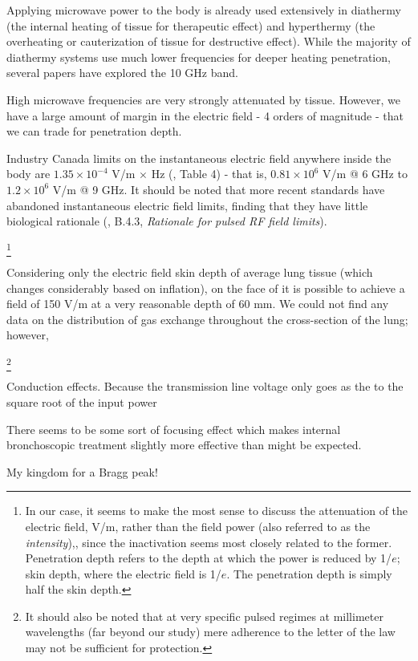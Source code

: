 \documentclass[paper.tex]{subfiles}
\begin{document}
Applying microwave power to the body is already used extensively in diathermy (the internal heating of tissue for therapeutic effect) and hyperthermy (the overheating or cauterization of tissue for destructive effect). While the majority of diathermy systems use much lower frequencies for deeper heating penetration, several papers have explored the 10 GHz band. 

High microwave frequencies are very strongly attenuated by tissue. However, we have a large amount of margin in the electric field - 4 orders of magnitude - that we can trade for penetration depth.

\cite{neuroinvasive2020} \cite{situ2020}


Industry Canada limits on the instantaneous electric field anywhere inside the body are $1.35 \times 10^{-4}$ V/m $\times$ Hz (\cite{RSS1022015}, Table 4) - that is, $0.81 \times 10^6$ V/m @ 6 GHz to $1.2 \times 10^6$ V/m @ 9 GHz. It should be noted that more recent standards have abandoned instantaneous electric field limits, finding that they have little biological rationale (\cite{C95}, B.4.3, {\it Rationale for pulsed RF field limits}).

\footnote{In our case, it seems to make the most sense to discuss the attenuation of the electric field, V/m, rather than the field power (also referred to as the {\it intensity}),\Wsqm, since the inactivation seems most closely related to the former. Penetration depth refers to the depth at which the power is reduced by 1/$e$; skin depth, where the electric field is 1/$e$. The penetration depth is simply half the skin depth.\cite{Penetration2019a}}

Considering only the electric field skin depth\cite{Safety2001}\cite{Physical1982} of average lung tissue\cite{gabriel1996compilation}\cite{Dielectricb}\cite{Dielectric}\cite{Tissue2018} (which changes considerably based on inflation), on the face of it is possible to achieve a field of 150 V/m at a very reasonable depth of 60 mm. We could not find any data on the distribution of gas exchange throughout the cross-section of the lung; however, 

\footnote{It should also be noted that at very specific pulsed regimes at millimeter wavelengths (far beyond our study) mere adherence to the letter of the law may not be sufficient for protection\cite{Limitations}.}




Conduction effects. Because the transmission line voltage only goes as the to the square root of the input power

There seems to be some sort of focusing effect which makes internal bronchoscopic treatment slightly more effective than might be expected.




My kingdom for a Bragg peak!

\clearpage
\printbibliography[heading=none, title={}, keyword={Flagship}]
\printbibliography[heading=none, title={}, keyword={standards}]
\end{document}
